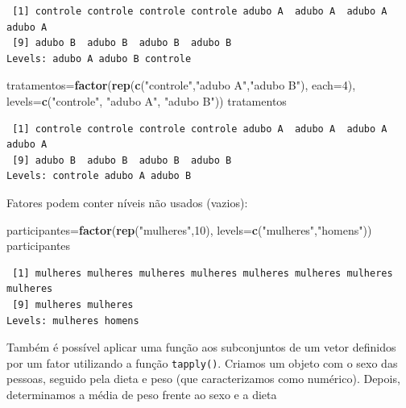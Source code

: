 \documentclass[12pt,brazil,oneside]{book}
\newenvironment{Shaded}{\begin{snugshade}}{\end{snugshade}}
\newcommand{\DataTypeTok}[1]{\textcolor[rgb]{0.13,0.29,0.53}{#1}}
\newcommand{\DecValTok}[1]{\textcolor[rgb]{0.00,0.00,0.81}{#1}}
\newcommand{\KeywordTok}[1]{\textcolor[rgb]{0.13,0.29,0.53}{\textbf{#1}}}
\newcommand{\NormalTok}[1]{#1}
\newcommand{\StringTok}[1]{\textcolor[rgb]{0.31,0.60,0.02}{#1}}
\begin{document}
\begin{verbatim}
 [1] controle controle controle controle adubo A  adubo A  adubo A  adubo A 
 [9] adubo B  adubo B  adubo B  adubo B 
Levels: adubo A adubo B controle
\end{verbatim}

\begin{Shaded}
\begin{Highlighting}[]
\NormalTok{tratamentos=}\KeywordTok{factor}\NormalTok{(}\KeywordTok{rep}\NormalTok{(}\KeywordTok{c}\NormalTok{(}\StringTok{"controle"}\NormalTok{,}\StringTok{"adubo A"}\NormalTok{,}\StringTok{"adubo B"}\NormalTok{), }\DataTypeTok{each=}\DecValTok{4}\NormalTok{), }
\DataTypeTok{levels=}\KeywordTok{c}\NormalTok{(}\StringTok{"controle"}\NormalTok{, }\StringTok{"adubo A"}\NormalTok{, }\StringTok{"adubo B"}\NormalTok{))}
\NormalTok{tratamentos}
\end{Highlighting}
\end{Shaded}

\begin{verbatim}
 [1] controle controle controle controle adubo A  adubo A  adubo A  adubo A 
 [9] adubo B  adubo B  adubo B  adubo B 
Levels: controle adubo A adubo B
\end{verbatim}

Fatores podem conter níveis não usados (vazios):

\begin{Shaded}
\begin{Highlighting}[]
\NormalTok{participantes=}\KeywordTok{factor}\NormalTok{(}\KeywordTok{rep}\NormalTok{(}\StringTok{"mulheres"}\NormalTok{,}\DecValTok{10}\NormalTok{), }\DataTypeTok{levels=}\KeywordTok{c}\NormalTok{(}\StringTok{"mulheres"}\NormalTok{,}\StringTok{"homens"}\NormalTok{))}
\NormalTok{participantes}
\end{Highlighting}
\end{Shaded}

\begin{verbatim}
 [1] mulheres mulheres mulheres mulheres mulheres mulheres mulheres mulheres
 [9] mulheres mulheres
Levels: mulheres homens
\end{verbatim}

Também é possível aplicar uma função aos subconjuntos de um vetor
definidos por um fator utilizando a função \texttt{tapply()}. Criamos um
objeto com o sexo das pessoas, seguido pela dieta e peso (que
caracterizamos como numérico). Depois, determinamos a média de peso
frente ao sexo e a dieta
\end{document}
